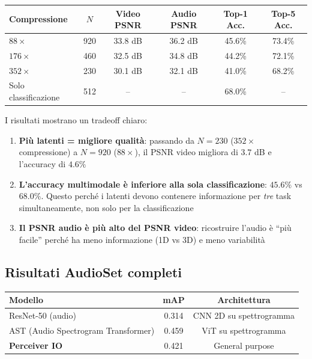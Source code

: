 \documentclass[12pt,a4paper]{article}
\begin{document}
\begin{center}
\begin{tabular}{lccccc}
\toprule
\textbf{Compressione} & \textbf{$N$} & \textbf{Video PSNR} & \textbf{Audio PSNR} & \textbf{Top-1 Acc.} & \textbf{Top-5 Acc.} \\
\midrule
$88\times$ & 920 & 33.8 dB & 36.2 dB & 45.6\% & 73.4\% \\
$176\times$ & 460 & 32.5 dB & 34.8 dB & 44.2\% & 72.1\% \\
$352\times$ & 230 & 30.1 dB & 32.1 dB & 41.0\% & 68.2\% \\
\midrule
Solo classificazione & 512 & -- & -- & 68.0\% & -- \\
\bottomrule
\end{tabular}
\end{center}

\begin{notabox}
I risultati mostrano un tradeoff chiaro:
\begin{enumerate}
    \item \textbf{Pi\`u latenti = migliore qualit\`a}: passando da $N = 230$ ($352\times$ compressione) a $N = 920$ ($88\times$), il PSNR video migliora di $3.7$ dB e l'accuracy di $4.6\%$
    \item \textbf{L'accuracy multimodale \`e inferiore alla sola classificazione}: $45.6\%$ vs $68.0\%$. Questo perch\'e i latenti devono contenere informazione per \emph{tre} task simultaneamente, non solo per la classificazione
    \item \textbf{Il PSNR audio \`e pi\`u alto del PSNR video}: ricostruire l'audio \`e ``pi\`u facile'' perch\'e ha meno informazione (1D vs 3D) e meno variabilit\`a
\end{enumerate}
\end{notabox}

\subsection{Risultati AudioSet completi}

\begin{center}
\begin{tabular}{lcc}
\toprule
\textbf{Modello} & \textbf{mAP} & \textbf{Architettura} \\
\midrule
ResNet-50 (audio) & 0.314 & CNN 2D su spettrogramma \\
AST (Audio Spectrogram Transformer) & 0.459 & ViT su spettrogramma \\
\textbf{Perceiver IO} & 0.421 & General purpose \\
\bottomrule
\end{tabular}
\end{center}
\end{document}
